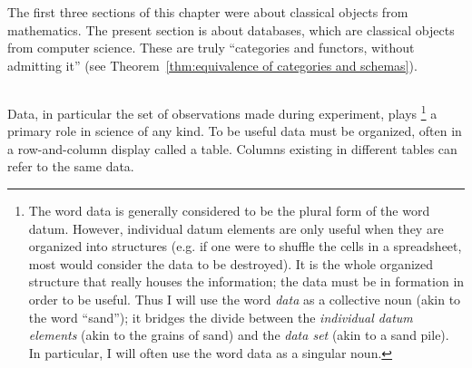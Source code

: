 \documentclass[../main/CT4S-EN-RU]{subfiles}
\begin{document}
\label{sec:databases}
\section{}\label{sec:databases}

\begin{blockENG}
The first three sections of this chapter were about classical objects from mathematics. The present section is about databases, which are classical objects from computer science. These are truly “categories and functors, without admitting it” (see Theorem~\ref{thm:equivalence of categories and schemas}).
\end{blockENG}

\begin{blockRUS}
\end{blockRUS}


\subsection{}\label{sec:what are dbs}

\begin{blockENG}
Data, in particular the set of observations made during experiment, plays
\footnote{The word data is generally considered to be the plural form of the word datum. However, individual datum elements are only useful when they are organized into structures (e.g. if one were to shuffle the cells in a spreadsheet, most would consider the data to be destroyed). It is the whole organized structure that really houses the information; the data must be in formation in order to be useful. Thus I will use the word {\em data} as a collective noun (akin to the word “sand”); it bridges the divide between the {\em individual datum elements} (akin to the grains of sand) and the {\em data set} (akin to a sand pile). In particular, I will often use the word data as a singular noun.}
a primary role in science of any kind. To be useful data must be organized, often in a row-and-column display called a table. Columns existing in different tables can refer to the same data.
\end{blockENG}

\begin{blockRUS}
\end{blockRUS}
\end{document}
